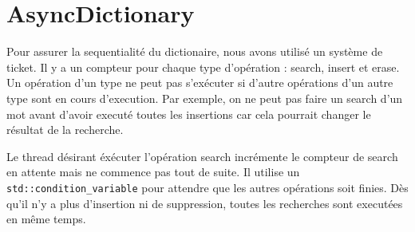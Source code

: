 \documentclass{article}
\begin{document}
\section{AsyncDictionary}
Pour assurer la sequentialité du dictionaire, nous avons utilisé un
système de ticket.
Il y a un compteur pour chaque type d'opération : search, insert et
erase.
Un opération d'un type ne peut pas s'exécuter si d'autre opérations d'un
autre type sont en cours d'execution. Par exemple, on ne peut pas faire un search
d'un mot avant d'avoir executé toutes les insertions car cela pourrait changer le
résultat de la recherche.

Le thread désirant éxécuter l'opération search incrémente le compteur de
search en attente mais ne commence pas tout de suite.
Il utilise un \texttt{std::condition\_variable} pour attendre que les
autres opérations soit finies.  Dès qu'il n'y a plus d'insertion ni de
suppression, toutes les recherches sont executées en même temps.
\end{document}
